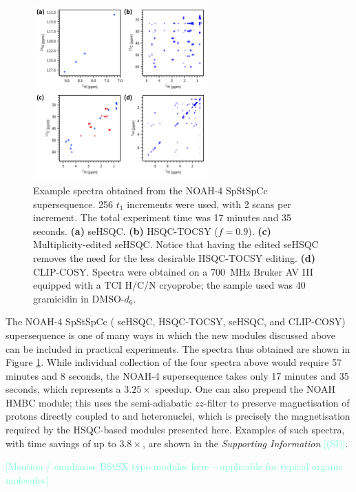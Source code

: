 \documentclass[11pt]{article}
\newcommand*{\carbon}{\ce{^{13}C}}
\newcommand*{\nitrogen}{\ce{^{15}N}}
\newcommand*{\hl}[1]{\textcolor{Aquamarine}{[#1]}}
\newcommand*{\figref}[1]{Figure \ref{fig:#1}}
\newcommand*{\SInf}{\textit{Supporting Information}}
\newcommand*{\sitodo}{\hl{(SI)}}
\newcommand*{\grami}{Spectra were obtained on a \SI{700}{\MHz} Bruker AV III equipped with a TCI H/C/N cryoprobe; the sample used was \SI{40}{\milli\molar} gramicidin in DMSO-$d_6$.}
\begin{document}
\begin{figure}
    \centering
    \includegraphics[width=0.6\textwidth]{spstspcc.png}
    \caption{
        Example spectra obtained from the NOAH-4 SpStSpCc supersequence.
        256 $t_1$ increments were used, with 2 scans per increment.
        The total experiment time was 17 minutes and 35 seconds.
        \textbf{(a)} \nitrogen{} seHSQC.
        \textbf{(b)} \carbon{} HSQC-TOCSY ($f = 0.9$).
        \textbf{(c)} Multiplicity-edited \carbon{} seHSQC. Notice that having the edited seHSQC removes the need for the less desirable HSQC-TOCSY editing.
        \textbf{(d)} CLIP-COSY.
        \grami{}
    }
    \label{fig:example_spec}
\end{figure}

The NOAH-4 SpStSpCc (\nitrogen{} seHSQC, \carbon{} HSQC-TOCSY, \carbon{} seHSQC, and CLIP-COSY) supersequence is one of many ways in which the new modules discussed above can be included in practical experiments.
The spectra thus obtained are shown in \figref{example_spec}.
While individual collection of the four spectra above would require 57 minutes and 8 seconds, the NOAH-4 supersequence takes only 17 minutes and 35 seconds, which represents a $3.25\times$ speedup.
One can also prepend the NOAH HMBC module;\autocite{Kupce2019JMR} this uses the semi-adiabatic $zz$-filter to preserve magnetisation of protons directly coupled to \carbon{} and \nitrogen{} heteronuclei, which is precisely the magnetisation required by the HSQC-based modules presented here.
Examples of such spectra, with time savings of up to $3.8\times$, are shown in the \SInf{} \sitodo{}.

\hl{Mention / emphasise BStSX type modules here -- applicable for typical organic molecules}
\end{document}
